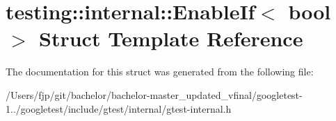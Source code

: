 \hypertarget{structtesting_1_1internal_1_1_enable_if}{}\section{testing\+:\+:internal\+:\+:Enable\+If$<$ bool $>$ Struct Template Reference}
\label{structtesting_1_1internal_1_1_enable_if}


The documentation for this struct was generated from the following file\+:\begin{DoxyCompactItemize}
\item 
/\+Users/fjp/git/bachelor/bachelor-\/master\+\_\+updated\+\_\+vfinal/googletest-\/1../googletest/include/gtest/internal/gtest-\/internal.\+h\end{DoxyCompactItemize}
